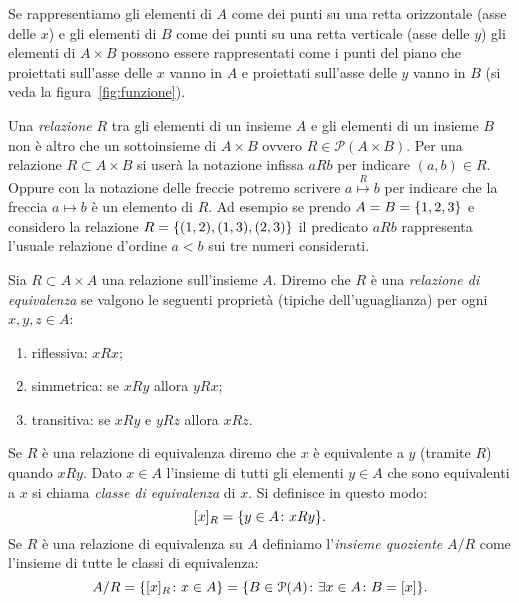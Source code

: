 Se rappresentiamo gli elementi di $A$ come dei punti su una retta
orizzontale (asse delle $x$) e gli elementi di $B$ come dei punti
su una retta verticale (asse delle $y$) gli elementi di $A\times B$
possono essere rappresentati come i punti del piano che proiettati sull'asse
delle $x$ vanno in $A$ e proiettati sull'asse delle $y$ vanno in $B$
(si veda la figura~\ref{fig:funzione}). 
  
Una \emph{relazione}%
%
 $R$ tra gli elementi di un insieme $A$ e gli elementi
di un insieme $B$ non è altro che un sottoinsieme di $A\times B$
ovvero $R\in \mathcal P(A\times B)$.
Per una relazione $R\subset A\times B$ si userà la notazione infissa
$aRb$ per indicare $(a,b)\in R$.
Oppure con la notazione delle freccie potremo 
scrivere $a \stackrel R \mapsto b$
per indicare che la freccia $a\mapsto b$ è un elemento di $R$. 
Ad esempio se prendo $A=B={\left\{ 1,2,3 \right\}}$ e considero la relazione 
$R={\left\{ (1,2),(1,3),(2,3) \right\}}$
il predicato $aRb$ rappresenta l'usuale relazione d'ordine $a<b$ sui
tre numeri considerati.

\begin{definition}
\label{def:equivalenza}%
Sia $R\subset A\times A$ una relazione sull'insieme $A$. Diremo che 
$R$ è una \emph{relazione di equivalenza}%
%
 se valgono le seguenti proprietà
(tipiche dell'uguaglianza)
per ogni $x,y,z\in A$:
\begin{enumerate}
  \item riflessiva: $x R x$;
  \item simmetrica: se $x R y$ allora $y R x$;
  \item transitiva: se $x R y$ e $yRz$ allora $x R z$.
\end{enumerate}
Se $R$ è una relazione di equivalenza diremo che $x$ è equivalente a $y$ 
(tramite $R$) quando $xRy$.
Dato $x \in A$ l'insieme di tutti gli elementi $y\in A$ che sono equivalenti 
a $x$ si chiama \emph{classe di equivalenza}%
%
 di $x$. 
Si definisce in questo modo:
\[
  [x]_R = {\left\{ y\in A \colon xRy \right\}}.  
\]
Se $R$ è una relazione di equivalenza su $A$ definiamo 
l'\emph{insieme quoziente}
%
%
$A/R$
come l'insieme di tutte le classi di equivalenza:
\[
 A/R 
 = {\left\{ [x]_R\colon x\in A \right\}} 
 = {\left\{ B\in \mathcal P(A)\colon \exists x\in A\colon B=[x] \right\}}.  
\]
\end{definition}

